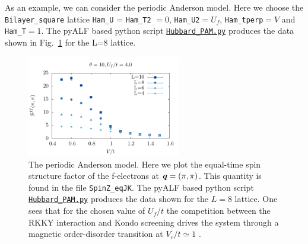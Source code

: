 As an example,  we can consider the periodic Anderson model.   Here we choose  the \texttt{Bilayer\_square}  lattice \texttt{Ham\_U} =  \texttt{Ham\_T2} $= 0$,  \texttt{Ham\_U2}$=U_f$,  \texttt{Ham\_tperp}$=V$  and \texttt{Ham\_T}$=1$.   The  pyALF  based python script    \href{https://git.physik.uni-wuerzburg.de/ALF/pyALF/-/blob/master/Scripts/Hubbard_PAM.py}{\texttt{Hubbard\_PAM.py}}  produces the data  shown in  Fig.~\ref{Fig:PAM}  for the L=8 lattice.  

\begin{figure}
\center
\includegraphics[width=0.6\textwidth]{Figures/PAM/PAM.pdf}

\caption{The periodic Anderson model.  Here we  plot the  equal-time spin structure factor  of the f-electrons  at $\boldsymbol{q} = (\pi,\pi)$.   This quantity is found in the file \texttt{SpinZ\_eqJK}.  The  pyALF  based python script    \href{https://git.physik.uni-wuerzburg.de/ALF/pyALF/-/blob/master/Scripts/Hubbard_PAM.py}{\texttt{Hubbard\_PAM.py}}  produces the data  shown for the $L=8$ lattice.    One sees  that for the chosen value of $U_f/t$  the competition between the RKKY interaction and  Kondo screening drives the system through a magnetic order-disorder transition at $V_c/t \simeq 1$  \cite{Vekic95}.}
        \label{Fig:PAM}
\end{figure}






